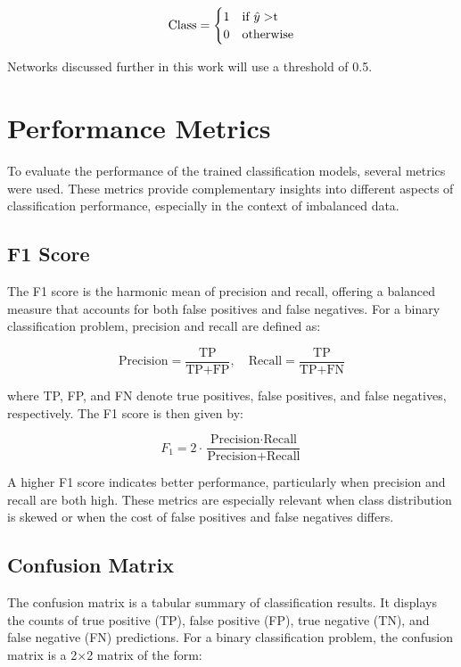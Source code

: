 \documentclass{pracalicmgr}
\begin{document}
\[
\text{Class} = 
\begin{cases}
1 & \text{if } \hat{y} > $t$ \\
0 & \text{otherwise}
\end{cases}
\]

Networks discussed further in this work will use a threshold of 0.5.

\section{Performance Metrics}

To evaluate the performance of the trained classification models, several metrics were used. These metrics provide complementary insights into different aspects of classification performance, especially in the context of imbalanced data.

\subsection{F1 Score}

The F1 score is the harmonic mean of precision and recall, offering a balanced measure that accounts for both false positives and false negatives. For a binary classification problem, precision and recall are defined as:

\[
\text{Precision} = \frac{\text{TP}}{\text{TP} + \text{FP}}, \quad
\text{Recall} = \frac{\text{TP}}{\text{TP} + \text{FN}}
\]

where TP, FP, and FN denote true positives, false positives, and false negatives, respectively. The F1 score is then given by:

\[
F_1 = 2 \cdot \frac{\text{Precision} \cdot \text{Recall}}{\text{Precision} + \text{Recall}}
\]

A higher F1 score indicates better performance, particularly when precision and recall are both high. These metrics are especially relevant when class distribution is skewed or when the cost of false positives and false negatives differs.

\subsection{Confusion Matrix}

The confusion matrix is a tabular summary of classification results. It displays the counts of true positive (TP), false positive (FP), true negative (TN), and false negative (FN) predictions. For a binary classification problem, the confusion matrix is a 2×2 matrix of the form:
\end{document}
